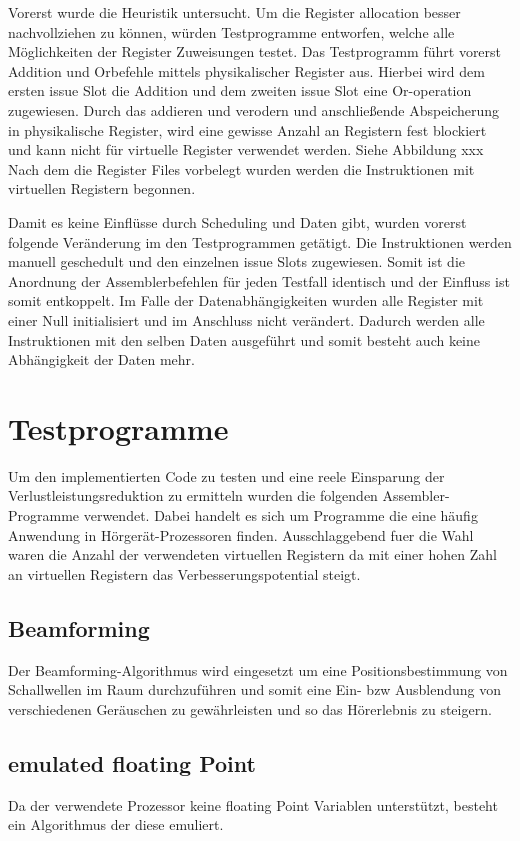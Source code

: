 Vorerst wurde die Heuristik untersucht.
Um die Register allocation besser nachvollziehen zu können, würden Testprogramme entworfen, welche alle Möglichkeiten der Register Zuweisungen testet. Das Testprogramm führt vorerst Addition und Orbefehle mittels physikalischer Register aus. Hierbei wird dem ersten issue Slot die Addition und dem zweiten issue Slot eine Or-operation zugewiesen. Durch das addieren und verodern und anschließende Abspeicherung in physikalische Register, wird eine gewisse Anzahl an Registern fest blockiert und kann nicht für virtuelle Register verwendet werden. Siehe Abbildung xxx
Nach dem die Register Files vorbelegt wurden werden die Instruktionen mit virtuellen Registern begonnen.

Damit es keine Einflüsse durch Scheduling und Daten gibt, wurden vorerst folgende Veränderung im den Testprogrammen getätigt. Die Instruktionen werden manuell geschedult und den einzelnen issue Slots zugewiesen. Somit ist die Anordnung der Assemblerbefehlen für jeden Testfall identisch und der Einfluss ist somit entkoppelt. Im Falle der Datenabhängigkeiten wurden alle Register mit einer Null initialisiert und im Anschluss nicht verändert. Dadurch werden alle Instruktionen mit den selben Daten ausgeführt und somit besteht auch keine Abhängigkeit der Daten mehr. 


\section{Testprogramme}
\label{sec:testprogamme}
Um den implementierten Code zu testen und eine reele Einsparung der Verlustleistungsreduktion zu ermitteln wurden die folgenden Assembler-Programme verwendet. Dabei handelt es sich um Programme die eine häufig Anwendung in Hörgerät-Prozessoren finden. Ausschlaggebend fuer die Wahl waren die Anzahl der verwendeten virtuellen Registern da mit einer hohen Zahl an virtuellen Registern das Verbesserungspotential steigt.
\subsection{Beamforming}
Der Beamforming-Algorithmus wird eingesetzt um eine Positionsbestimmung von Schallwellen im Raum durchzuführen und somit eine Ein- bzw Ausblendung von verschiedenen Geräuschen zu gewährleisten und so das Hörerlebnis zu steigern. 

\subsection{emulated floating Point}
Da der verwendete Prozessor keine floating Point Variablen unterstützt, besteht ein Algorithmus der diese emuliert. 

